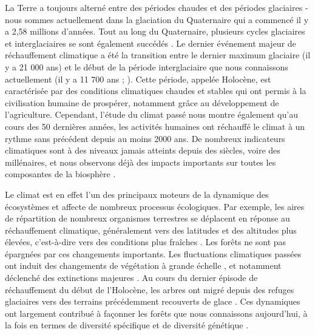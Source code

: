 La Terre a toujours alterné entre des périodes chaudes et des périodes glaciaires - nous sommes actuellement dans la glaciation du Quaternaire qui a commencé il y a 2,58 millions d'années. Tout au long du Quaternaire, plusieurs cycles glaciaires et interglaciaires se sont également succédés \citep{Snyder2016, Koehler2010}. Le dernier événement majeur de réchauffement climatique a été la transition entre le dernier maximum glaciaire (il y a 21 000 ans) et le début de la période interglaciaire que nous connaissons actuellement (il y a 11 700 ans ; ). Cette période, appelée Holocène, est caractérisée par des conditions climatiques chaudes et stables qui ont permis à la civilisation humaine de prospérer, notamment grâce au développement de l'agriculture. 
Cependant, l'étude du climat passé nous montre également qu'au cours des 50 dernières années, les activités humaines ont réchauffé le climat à un rythme sans précédent depuis au moins 2000 ans. De nombreux indicateurs climatiques sont à des niveaux jamais atteints depuis des siècles, voire des millénaires, et nous observons déjà des impacts importants sur toutes les composantes de la biosphère \citep{IPCC2021}.

Le climat est en effet l'un des principaux moteurs de la dynamique des écosystèmes et affecte de nombreux processus écologiques. Par exemple, les aires de répartition de nombreux organismes terrestres se déplacent en réponse au réchauffement climatique, généralement vers des latitudes et des altitudes plus élevées, c'est-à-dire vers des conditions plus fraîches \citep{Lenoir2008, Elmendorf2015, Pecl2017, Vitasse2021, Rumpf2018, Zurell2024}. Les forêts ne sont pas épargnées par ces changements importants. 
Les fluctuations climatiques passées ont induit des changements de végétation à grande échelle \citep{Hoogakker2016, Nolan2018}, et notamment déclenché des extinctions majeures \citep{Svenning2003}.  Au cours du dernier épisode de réchauffement du début de l'Holocène, les arbres ont migré depuis des refuges glaciaires vers des terrains précédemment recouverts de glace \citep{Brewer2002, TerhuerneBerson2004, Saltre2013, Robin2016}. Ces dynamiques ont largement contribué à façonner les forêts que nous connaissons aujourd'hui, à la fois en termes de diversité spécifique \citep{Svenning2007} et de diversité génétique \citep{Cheddadi2006}.

